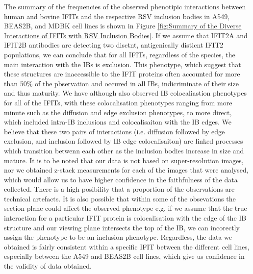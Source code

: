 The summary of the frequencies of the observed phenotipic interactions between human and bovine IFITs and the respective RSV inclusion bodies in A549, BEAS2B, and MDBK cell lines is shown in Figure \ref{fig:Summary of the Diverse Interactions of IFITs with RSV Inclusion Bodies}. If we assume that IFIT2A and IFIT2B antibodies are detecting two disctnt, antigenically disticnt IFIT2 populations, we can conclude that for all IFITs, regardless of the species, the main interaction with the IBs is exclusion. This phenotype, which suggest that these structures are inaccessible to the IFIT proteins often accounted for more than 50\% of the pbservation and occured in all IBs, indicriminate of their size and thus maturity. We have although also observed IB colocaliastion phenotypes for all of the IFITs, with these colocalisation phenotypes ranging from more minute such as the diffusion and edge exclusion phenotypes, to more direct, which included intra-IB inclusions and colocalisaiton with the IB edges. We believe that these two pairs of interactions (i.e. diffusion followed by edge exclusion, and inclusion followed by IB edge colocalisaiton) are linked processes which transition betwenn each other as the inclusion bodies increase in size and mature. It is to be noted that our data is not based on super-resolution images, nor we obtained z-stack measurements for each of the images that were analysed, which would allow us to have higher confidence in the faithfulness of the data collected. There is a high posibility that a proportion of the observations are technical artefacts. It is also possible that within some of the obsevations the section plane could affect the observed phenotype e.g. if we assume that the true interaction for a particular IFIT protein is colocalisation with the edge of the IB structure and our viewing plane intersects the top of the IB, we can incorectly assign the phenotype to be an inclusion phenotype. Regardless, the data we obtained is fairly consistent within a specific IFIT between the different cell lines, especially between the A549 and BEAS2B cell lines, which give us confidence in the validity of data obtained.

